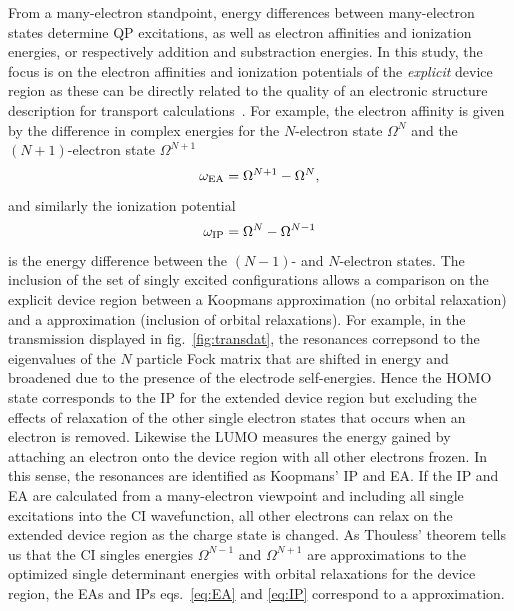 From a many-electron standpoint, energy differences between many-electron
states determine \ac{QP} excitations, as well as electron affinities
and ionization energies, or respectively addition and substraction energies. 
In this study, the focus is on the electron affinities and ionization
potentials of the {\it explicit} device region as these can be directly
related to the quality of an electronic structure description for transport
calculations~\cite{golden}. For example, the electron affinity is given
by the difference in complex energies for the $N$-electron state $\Omega^N$
and the $(N+1)$-electron state $\Omega^{N+1}$
\numparts
\begin{equation}
\label{eq:EA}
\omega_{\rm EA} = \Omega^{N+1} -\Omega^N,
\end{equation}
and similarly the ionization potential
\begin{equation}
\label{eq:IP}
\omega_{\rm IP} =  \Omega^N - \Omega^{N-1}
\end{equation}
\endnumparts
is the energy difference between the $(N-1)$- and $N$-electron states.
The inclusion of the set of singly excited configurations allows a
comparison on the explicit device region between a Koopmans approximation 
(no orbital relaxation) and a \dscf approximation (inclusion of
orbital relaxations).  For example, in the transmission displayed in
fig.~\ref{fig:transdat}, the resonances correpsond to the eigenvalues of
the $N$ particle Fock matrix that are shifted in energy and broadened due
to the presence of the electrode self-energies. Hence the \ac{HOMO} state
corresponds to the IP for the extended device region but excluding the
effects of relaxation of the other single electron states that occurs
when an electron is removed. Likewise the LUMO measures the energy gained
by attaching an electron onto the device region with all other electrons
frozen. In this sense, the resonances are identified as Koopmans' IP and
EA. If the IP and EA are calculated from a many-electron viewpoint and
including all single excitations into the CI wavefunction,
all other electrons can relax on the extended device region as the charge
state is changed. As Thouless' theorem tells us that the CI singles
energies $\Omega^{N-1}$ and $\Omega^{N+1}$ are approximations to the optimized
single determinant energies with orbital relaxations for the device region,
the EAs and IPs eqs.~\ref{eq:EA} and \ref{eq:IP} correspond to a \dscf
approximation. 

